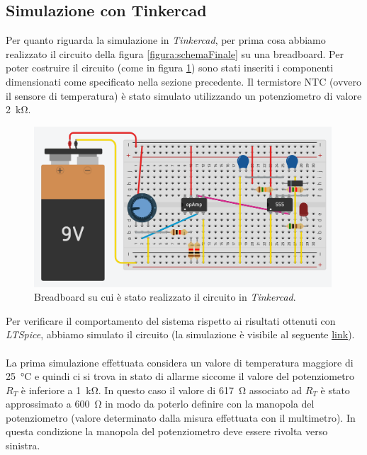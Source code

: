 \documentclass{report}
\begin{document}
\subsection{Simulazione con Tinkercad}\label{tinkercad}
Per quanto riguarda la simulazione in \textit{Tinkercad}, per prima cosa abbiamo realizzato il circuito della figura \ref{figura:schemaFinale} su una breadboard. Per poter costruire il circuito (come in figura \ref{figura:tinkercad_breadboard}) sono stati inseriti i componenti dimensionati come specificato nella sezione precedente. Il termistore NTC (ovvero il sensore di temperatura) è stato simulato utilizzando un potenziometro di valore \SI{2}{\kilo\ohm}.

\begin{figure}[h!]
	\centering
	\includegraphics[height=6cm]{immagini/tinkercad_breadboard}
	\caption{Breadboard su cui è stato realizzato il circuito in \textit{Tinkercad}.} 
	\label{figura:tinkercad_breadboard}
\end{figure}

Per verificare il comportamento del sistema rispetto ai risultati ottenuti con \textit{LTSpice}, abbiamo simulato il circuito (la simulazione è visibile al seguente \textcolor{blue}{\underline{\href{https://www.tinkercad.com/things/5cgEecbtMyg-copy-of-stunning-snicket/editel?sharecode=9z73QqFvXyHOBVZMRfgNmmMNsfyYwwq-TDywLOMkaKc}{link}}}).
\\\\\noindent La prima simulazione effettuata considera un valore di temperatura maggiore di \SI{25}{\celsius} e quindi ci si trova in stato di allarme siccome il valore del potenziometro $R_T$ è inferiore a \SI{1}{\kilo\ohm}. In questo caso il valore di \SI{617}{\ohm} associato ad $R_T$ è stato approssimato a \SI{600}{\ohm} in modo da poterlo definire con la manopola del potenziometro (valore determinato dalla misura effettuata con il multimetro). In questa condizione la manopola del potenziometro deve essere rivolta verso sinistra.
\end{document}
